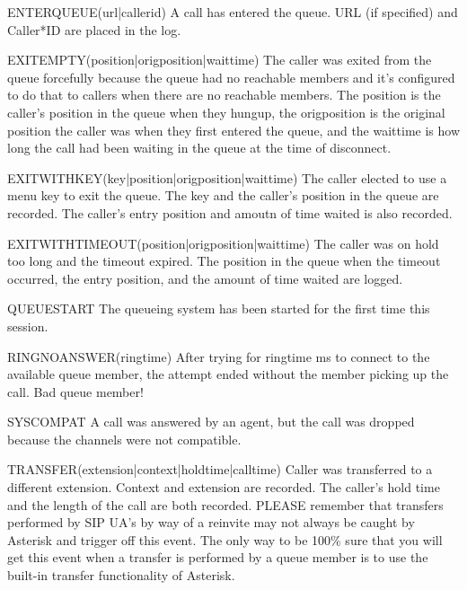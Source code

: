 ENTERQUEUE(url|callerid)
A call has entered the queue.  URL (if specified) and Caller*ID are placed
in the log.

EXITEMPTY(position|origposition|waittime)
The caller was exited from the queue forcefully because the queue had no
reachable members and it's configured to do that to callers when there
are no reachable members. The position is the caller's position in the
queue when they hungup, the origposition is the original position the 
caller was when they first entered the queue, and the waittime is how 
long the call had been waiting in the queue at the time of disconnect.

EXITWITHKEY(key|position|origposition|waittime)
The caller elected to use a menu key to exit the queue.  The key and
the caller's position in the queue are recorded.  The caller's entry
position and amoutn of time waited is also recorded.

EXITWITHTIMEOUT(position|origposition|waittime)
The caller was on hold too long and the timeout expired.  The position in the
queue when the timeout occurred, the entry position, and the amount of time
waited are logged.

QUEUESTART
The queueing system has been started for the first time this session.

RINGNOANSWER(ringtime)
After trying for ringtime ms to connect to the available queue member,
the attempt ended without the member picking up the call. Bad queue
member!

SYSCOMPAT
A call was answered by an agent, but the call was dropped because the 
channels were not compatible.

TRANSFER(extension|context|holdtime|calltime)
Caller was transferred to a different extension.  Context and extension
are recorded. The caller's hold time and the length of the call are both
recorded. PLEASE remember that transfers performed by SIP UA's by way
of a reinvite may not always be caught by Asterisk and trigger off this
event. The only way to be 100\% sure that you will get this event when
a transfer is performed by a queue member is to use the built-in transfer
functionality of Asterisk.

